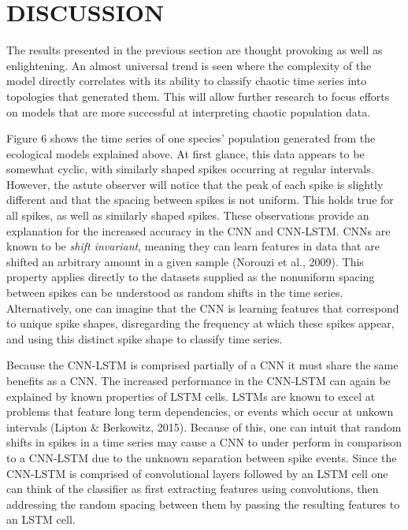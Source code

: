\documentclass[letterpaper, 10 pt, conference]{ieeeconf}  %
\begin{document}
\section{DISCUSSION}
	The results presented in the previous section are thought provoking as well as enlightening. An almost universal trend is seen where the complexity of the model directly correlates with its ability to classify chaotic time series into topologies that generated them. This will allow further research to focus efforts on models that are more successful at interpreting chaotic population data. 
   
   Figure 6 shows the time series of one species' population generated from the ecological models explained above. At first glance, this data appears to be somewhat cyclic, with similarly shaped spikes occurring at regular intervals. However, the astute observer will notice that the peak of each spike is slightly different and that the spacing between spikes is not uniform. This holds true for all spikes, as well as similarly shaped spikes. These observations provide an explanation for the increased accuracy in the CNN and CNN-LSTM. CNNs are known to be \textit{shift invariant}, meaning they can learn features in data that are shifted an arbitrary amount in a given sample (Norouzi et al., 2009). This property applies directly to the datasets supplied as the nonuniform spacing between spikes can be understood as random shifts in the time series. Alternatively, one can imagine that the CNN is learning features that correspond to unique spike shapes, disregarding the frequency at which these spikes appear, and using this distinct spike shape to classify time series.
   
   Because the CNN-LSTM is comprised partially of a CNN it must share the same benefits as a CNN. The increased performance in the CNN-LSTM can again be explained by known properties of LSTM cells. LSTMs are known to excel at problems that feature long term dependencies, or events which occur at unkown intervals (Lipton \& Berkowitz, 2015). Because of this, one can intuit that random shifts in spikes in a time series may cause a CNN to under perform in comparison to a CNN-LSTM due to the unknown separation between spike events. Since the CNN-LSTM is comprised of convolutional layers followed by an LSTM cell one can think of the classifier as first extracting features using convolutions, then addressing the random spacing between them by passing the resulting features to an LSTM cell. 
\end{document}
